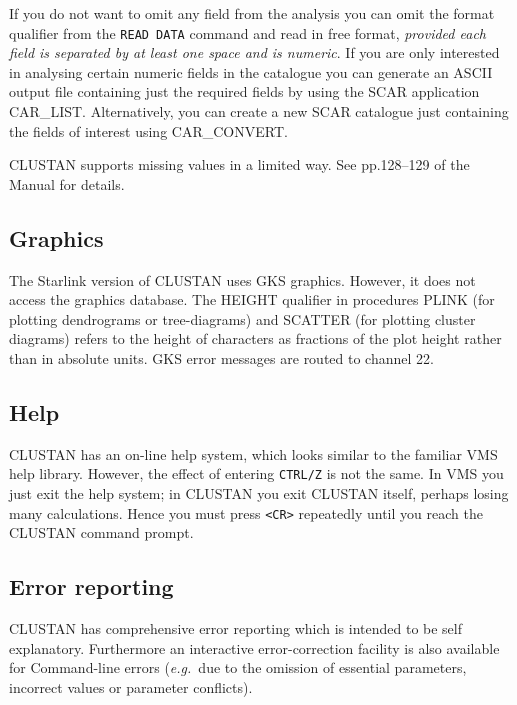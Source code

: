 If you do not want to omit any field from the analysis you can omit
the format qualifier from the {\tt READ DATA} command and read in
free format, {\em provided each field is separated by at least one space
and is numeric}. If you are only interested in analysing certain numeric
fields in the catalogue you can generate an ASCII output file containing
just the required fields by using the SCAR application CAR\_LIST.
Alternatively, you can create a new SCAR catalogue just containing the
fields of interest using CAR\_CONVERT. 

{\small CLUSTAN} supports missing values in a limited way.  See pp.128--129
of the Manual for details.

\subsection{Graphics}
The Starlink version of {\small CLUSTAN} uses GKS graphics.  However, it
does not access the graphics database. The HEIGHT qualifier in
procedures PLINK (for plotting dendrograms or tree-diagrams) and SCATTER 
(for plotting cluster diagrams) refers to the height of characters as
fractions of the plot height rather than in absolute units. GKS error
messages are routed to channel 22.
\subsection{Help}
{\small CLUSTAN} has an on-line help system, which looks similar to the 
familiar VMS help library.  However, the effect of entering {\tt CTRL/Z} is 
not the same. In VMS you just exit the help system; in {\small CLUSTAN} you 
exit {\small CLUSTAN} itself, perhaps losing many calculations. Hence you must 
press {\tt <CR>} repeatedly until you reach the {\small CLUSTAN} command prompt.
\subsection{Error reporting}
{\small CLUSTAN} has comprehensive error reporting which is intended to be
self explanatory. Furthermore an interactive error-correction facility is also
available for Command-line errors ({\it e.g.}\ due to the omission
of essential parameters, incorrect values or parameter conflicts).
